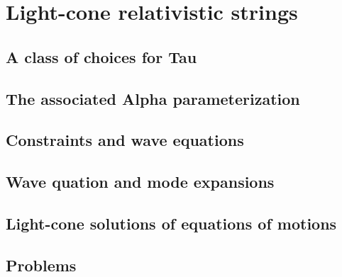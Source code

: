 \documentclass[12pt]{report}
\begin{document}
\chapter{Light-cone relativistic strings}
\newpage
\section{A class of choices for Tau}
\section{The associated Alpha parameterization}
\section{Constraints and wave equations}
\section{Wave quation and mode expansions}
\section{Light-cone solutions of equations of motions}
\section{Problems}
\end{document}
